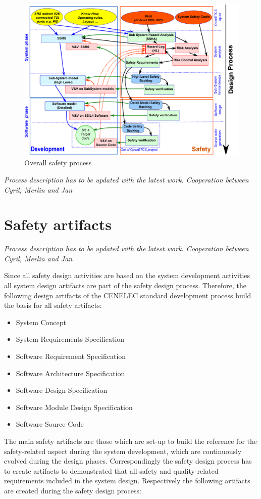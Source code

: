 \documentclass{template/openetcs_report}
\begin{document}
\begin{figure}[h]
\centering
\includegraphics[width=0.7\linewidth]{./images/WholeSafetyProcess}
\caption[Overall safety process]{Overall safety process}
\label{fig:SafetyProcess}
\end{figure}

\textit{Process description has to be updated with the latest work. Cooperation between Cyril, Merlin and Jan}

\section{Safety artifacts}

\textit{Process description has to be updated with the latest work. Cooperation between Cyril, Merlin and Jan}

Since all safety design activities are based on the system development activities all system design artifacts are part of the safety design process. Therefore, the following design artifacts of the CENELEC standard development process build the basis for all safety artifacts:

\begin{itemize}
\item System Concept
\item System Requirements Specification
\item Software Requirement Specification
\item Software Architecture Specification
\item Software Design Specification
\item Software Module Design Specification
\item Software Source Code
\end{itemize}

The main safety artifacts are those which are set-up to build the reference for the safety-related aspect during the system development, which are continuously evolved during the design phases. Correspondingly the safety design process has to create artifacts to demonstrated that all safety and quality-related requirements included in the system design. Respectively the following artifacts are created during the safety design process:
\end{document}

